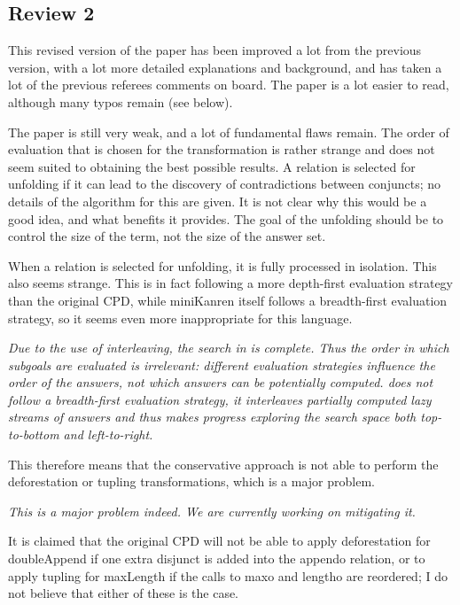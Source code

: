 
\subsection*{Review 2}


This revised version of the paper has been improved a lot from the previous version, with a lot more
detailed explanations and background, and has taken a lot of the previous referees comments on board.
The paper is a lot easier to read, although many typos remain (see below).

The paper is still very weak, and a lot of fundamental flaws remain. The order of evaluation that is
chosen for the transformation is rather strange and does not seem suited to obtaining the best possible
results. A relation is selected for unfolding if it can lead to the discovery of contradictions between conjuncts;
no details of the algorithm for this are given. It is not clear why this would be a good idea, and what benefits
it provides. The goal of the unfolding should be to control the size of the term, not the size of the answer set.

When a relation is selected for unfolding, it is fully processed in isolation. This also seems strange. This is
in fact following a more depth-first evaluation strategy than the original CPD, while miniKanren itself follows
a breadth-first evaluation strategy, so it seems even more inappropriate for this language.

\emph{Due to the use of interleaving, the search in \mk is complete. Thus the order in which subgoals are evaluated is irrelevant: different evaluation strategies influence the order of the answers, not which answers can be potentially computed. \mk does not follow a breadth-first evaluation strategy, it interleaves partially computed lazy streams of answers and thus makes progress exploring the search space both top-to-bottom and left-to-right. }

This therefore means
that the conservative approach is not able to perform the deforestation or tupling transformations, which is a
major problem.

\emph{This is a major problem indeed. We are currently working on mitigating it.}

It is claimed that the original CPD will not be able to apply deforestation for doubleAppend if
one extra disjunct is added into the appendo relation, or to apply tupling for maxLength if the calls to maxo and
lengtho are reordered; I do not believe that either of these is the case.

